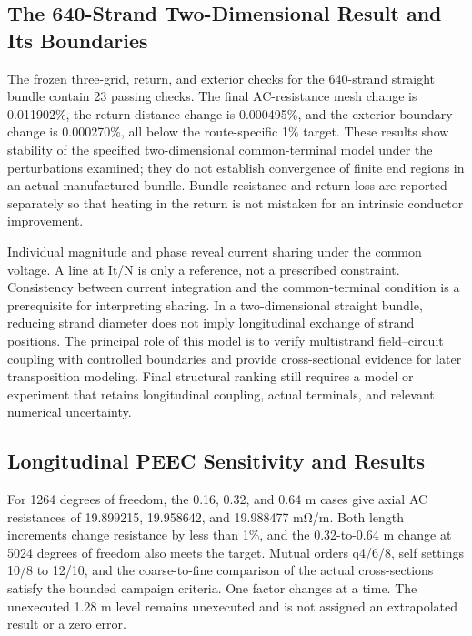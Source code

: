 \documentclass[journal,10pt]{IEEEtran}
\begin{document}
\subsection*{The 640-Strand Two-Dimensional Result and Its Boundaries}
\hypertarget{03.coax_results.heading}{}
The frozen three-grid, return, and exterior checks for the 640-strand straight bundle contain 23 passing checks. The final AC-resistance mesh change is 0.011902\%, the return-distance change is 0.000495\%, and the exterior-boundary change is 0.000270\%, all below the route-specific 1\% target. These results show stability of the specified two-dimensional common-terminal model under the perturbations examined; they do not establish convergence of finite end regions in an actual manufactured bundle. Bundle resistance and return loss are reported separately so that heating in the return is not mistaken for an intrinsic conductor improvement.


Individual magnitude and phase reveal current sharing under the common voltage. A line at It/N is only a reference, not a prescribed constraint. Consistency between current integration and the common-terminal condition is a prerequisite for interpreting sharing. In a two-dimensional straight bundle, reducing strand diameter does not imply longitudinal exchange of strand positions. The principal role of this model is to verify multistrand field–circuit coupling with controlled boundaries and provide cross-sectional evidence for later transposition modeling. Final structural ranking still requires a model or experiment that retains longitudinal coupling, actual terminals, and relevant numerical uncertainty.


\subsection*{Longitudinal PEEC Sensitivity and Results}
\hypertarget{03.peec_results.heading}{}
For 1264 degrees of freedom, the 0.16, 0.32, and 0.64 m cases give axial AC resistances of 19.899215, 19.958642, and 19.988477 mΩ/m. Both length increments change resistance by less than 1\%, and the 0.32-to-0.64 m change at 5024 degrees of freedom also meets the target. Mutual orders q4/6/8, self settings 10/8 to 12/10, and the coarse-to-fine comparison of the actual cross-sections satisfy the bounded campaign criteria. One factor changes at a time. The unexecuted 1.28 m level remains unexecuted and is not assigned an extrapolated result or a zero error.
\end{document}
